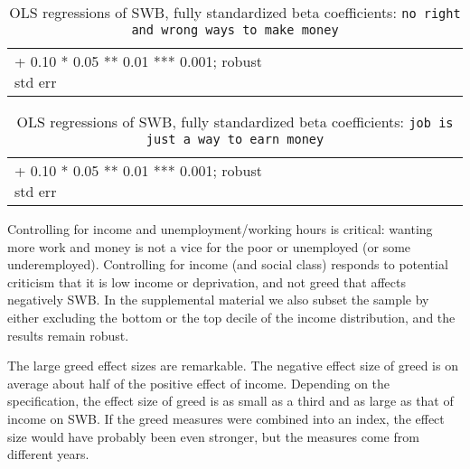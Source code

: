 \documentclass[10pt, letterpaper]{article}
\begin{document}
\begin{spacing}{1.8}
\begin{spacing}{.9} \begin{table}[H]\centering   \begin{scriptsize} \begin{tabular}{p{1.8in}p{.5in}p{.5in}p{.5in}p{.5in}p{.5in}p{.5in}p{.5in}p{.5in}p{.5in}p{.5 in}p{.5in}p{.5 in}}\hline  \hline + 0.10 * 0.05 ** 0.01 *** 0.001; robust std err \end{tabular}\end{scriptsize}\caption{\label{betac}OLS regressions of SWB, fully standardized beta coefficients: \texttt{no right  and wrong ways to  make money}}\end{table} \end{spacing}

\begin{spacing}{.9} \begin{table}[H]\centering   \begin{scriptsize} \begin{tabular}{p{1.8in}p{.5in}p{.5in}p{.5in}p{.5in}p{.5in}p{.5in}p{.5in}p{.5in}p{.5in}p{.5 in}p{.5in}p{.5 in}}\hline  \hline + 0.10 * 0.05 ** 0.01 *** 0.001; robust std err \end{tabular}\end{scriptsize}\caption{\label{betad}OLS regressions of SWB, fully standardized beta coefficients: \texttt{job is just a way to earn money}}\end{table} \end{spacing}


Controlling for income and unemployment/working hours is critical: wanting more work and money is not a vice for the poor or unemployed (or some underemployed). 
Controlling for income (and social class) responds to potential criticism  that it is low
income or deprivation, and not greed that affects negatively SWB. In the
supplemental material we also subset the sample by either excluding the bottom or the top decile of the income distribution, and the results remain robust.  

The large greed effect sizes %
 are remarkable. The negative
effect size of greed is on average about half of the positive effect of
income. Depending on the specification, the effect size of greed is as small as
a third and as large as that of  income on SWB.
%
If the greed measures were combined into an index, the effect size would have probably
been even stronger, but the measures come from different years.


\end{spacing}
\end{document}
